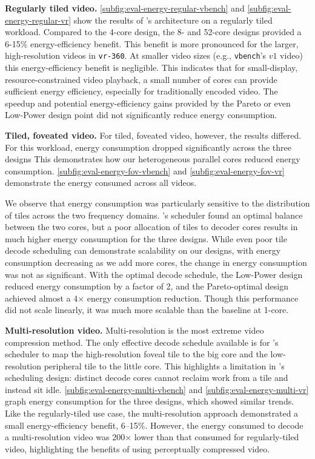 \textbf{Regularly tiled video. } \ref{subfig:eval-energy-regular-vbench} and \ref{subfig:eval-energy-regular-vr} show the results of \nameArch's architecture on a regularly tiled workload.
Compared to the 4-core design, the 8- and 52-core designs provided a 6-15\% energy-efficiency benefit.
This benefit is more pronounced for the larger, high-resolution videos in \texttt{vr-360}.
At smaller video sizes (e.g., \texttt{vbench}'s $v1$ video) this energy-efficiency benefit is negligible.
This indicates that for small-display, resource-constrained video playback, a small number of cores can provide sufficient energy efficiency, especially for traditionally encoded video.
The speedup and potential energy-efficiency gains provided by the Pareto or even Low-Power design point did not significantly reduce energy consumption.

\textbf{Tiled, foveated video. } For tiled, foveated video, however, the results differed.
For this workload, energy consumption dropped significantly across the three designs
This demonstrates how our heterogeneous parallel cores reduced energy consumption.
\ref{subfig:eval-energy-fov-vbench} and \ref{subfig:eval-energy-fov-vr} demonstrate the energy consumed across all videos.

We observe that energy consumption was particularly sensitive to the distribution of tiles across the two frequency domains.
\nameArch's scheduler found an optimal balance between the two cores, but a poor allocation of tiles to decoder cores results in much higher energy consumption for the three \nameArch designs.
While even poor tile decode scheduling can demonstrate scalability on our designs, with energy consumption decreasing as we add more cores, the change in energy consumption was not as significant.
With the optimal decode schedule, the Low-Power design reduced energy consumption by a factor of 2, and the Pareto-optimal design achieved almost a 4$\times$ energy consumption reduction.
Though this performance did not scale linearly, it was much more scalable than the baseline at 1-core.

\textbf{Multi-resolution video. } Multi-resolution is the most extreme video compression method.
The only effective decode schedule available is for \nameArch's scheduler to map the high-resolution foveal tile to the big core and the low-resolution peripheral tile to the little core.
This highlights a limitation in \nameArch's scheduling design: distinct decode cores cannot reclaim work from a tile and instead sit idle.
\ref{subfig:eval-energy-multi-vbench} and \ref{subfig:eval-energy-multi-vr} graph energy consumption for the three designs, which showed similar trends.
Like the regularly-tiled use case, the multi-resolution approach demonstrated a small energy-efficiency benefit, 6--15\%.
However, the energy consumed to decode a multi-resolution video was 200$\times$ lower than that consumed for regularly-tiled video, highlighting the benefits of using perceptually compressed video.
